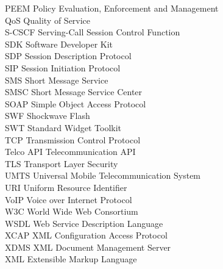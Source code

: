 \begin{tabbing}
    PEEM	 \> 	Policy Evaluation, Enforcement and Management	 \\
    QoS	 \> 	Quality of Service	 \\
    S-CSCF	 \> 	Serving-Call Session Control Function	 \\
    SDK	\>	Software Developer Kit \\
    SDP	\>	Session Description Protocol \\
    SIP	 \> 	Session Initiation Protocol	 \\
    SMS	\>	Short Message Service \\
    SMSC	\> Short Message Service Center \\
    SOAP	 \> 	Simple Object Access Protocol	 \\
    SWF	\>	Shockwave Flash \\
    SWT	\>	Standard Widget Toolkit \\
    TCP	 \> 	Transmission Control Protocol	 \\
    Telco API	\>	Telecommunication API \\
    TLS	\>	Transport Layer Security \\
    UMTS	 \> 	Universal Mobile Telecommunication System	 \\
    URI	 \> 	Uniform Resource Identifier	 \\
    VoIP	 \> 	Voice over Internet Protocol	 \\
    W3C	 \> 	World Wide Web Consortium	 \\
    WSDL	\>	Web Service Description Language \\
    XCAP	 \> 	XML Configuration Access Protocol	 \\
    XDMS	 \> 	XML Document Management Server	 \\
    XML	 \> 	Extensible Markup Language	 \\
\end{tabbing}
\endinput
